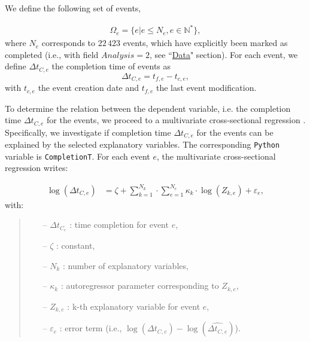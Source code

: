 \documentclass[unnumsec,webpdf,contemporary,large]{oup-authoring-template}%
\theoremstyle{thmstyleone}%
\theoremstyle{thmstyletwo}%
\theoremstyle{thmstylethree}%
\begin{document}
We define the following set of events,

\begin{align}
    \Omega_e = \{e|e \leq N_e, e \in \mathbb{N}^{\ast}\},
\end{align}
\noindent
where $N_e$ corresponds to $22\,423$ events, which have explicitly been marked as completed (i.e., with field $Analysis = 2$, see ``\hyperref[sec:data]{Data}" section). For each event, we define $\Delta t_{C,e}$ the completion time of events as 
\begin{equation}
    \Delta t_{C,e} = t_{f,e} - t_{c,e},
\end{equation} 
\noindent
with $t_{c,e}$ the event creation date and $t_{f,e}$ the last event modification.  

To determine the relation between the dependent variable, i.e. the completion time $\Delta t_{C,e}$ for the events, we proceed to a multivariate cross-sectional regression \cite{asteriou_applied_2015}. Specifically, we investigate if completion time $\Delta t_{C,e}$ for the events can be explained by the selected explanatory variables. The corresponding \texttt{Python} variable is \texttt{CompletionT}. For each event $e$, the multivariate cross-sectional regression writes:

\begin{align}
    \log(\Delta t_{C,e}) &= \zeta + \sum_{k=1}^{N_k} \cdot \sum_{e=1}^{N_e} \kappa_{k} \cdot \log(Z_{k,e}) + \varepsilon_e,
    \label{eq:EcoModel}
\end{align}
\noindent
with:
\begin{quote}
   \begin{itemize}
       \item[--] $\Delta t_{C_e}$ : time completion for event $e$, 
       \item[--] $\zeta$ : constant,
        \item[--] $N_k$ : number of explanatory variables,
       \item[--] $\kappa_{k}$ : autoregressor parameter  corresponding to $Z_{k,e}$,
       \item[--] $Z_{k,e}$ : k-th explanatory variable for event $e$,
       \item[--] $\varepsilon_e$ : error term (i.e., $\log(\Delta t_{C,e}) - \log(\widehat{\Delta t_{C,e}})$). 
   \end{itemize}
\end{quote}
\end{document}
